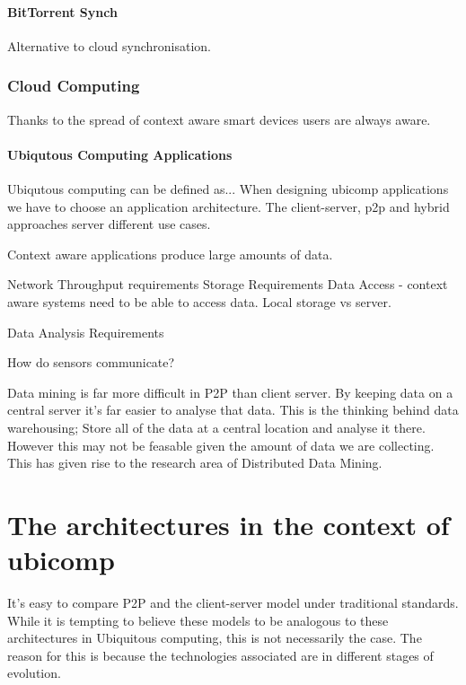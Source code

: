 \documentclass[11pt]{amsart}
\begin{document}
\subsection{BitTorrent Synch}

Alternative to cloud synchronisation.

\section{Cloud Computing}

Thanks to the spread of context aware smart devices users are always aware.

\subsection{Ubiqutous Computing Applications}

Ubiqutous computing  can be defined as... 
When designing ubicomp applications we have to choose an application architecture. The client-server, p2p and hybrid approaches server different use cases. 

Context aware applications produce large amounts of data.

Network
Throughput requirements
Storage Requirements
Data Access - context aware systems need to be able to access data. Local storage vs server.

Data Analysis Requirements

How do sensors communicate?

Data mining is far more difficult in P2P than client server. By keeping data on a central server it's far easier to analyse that data. This is the thinking behind data warehousing; Store all of the data at a central location and analyse it there. However this may not be feasable given the amount of data we are collecting. This has given rise to the research area of Distributed Data Mining.

\part{The architectures in the context of ubicomp}

It's easy to compare P2P and the client-server model under traditional standards. While it is tempting to believe these models to be analogous to these architectures in Ubiquitous computing, this is not necessarily the case. The reason for this is because the technologies associated are in different stages of evolution.
\end{document}
